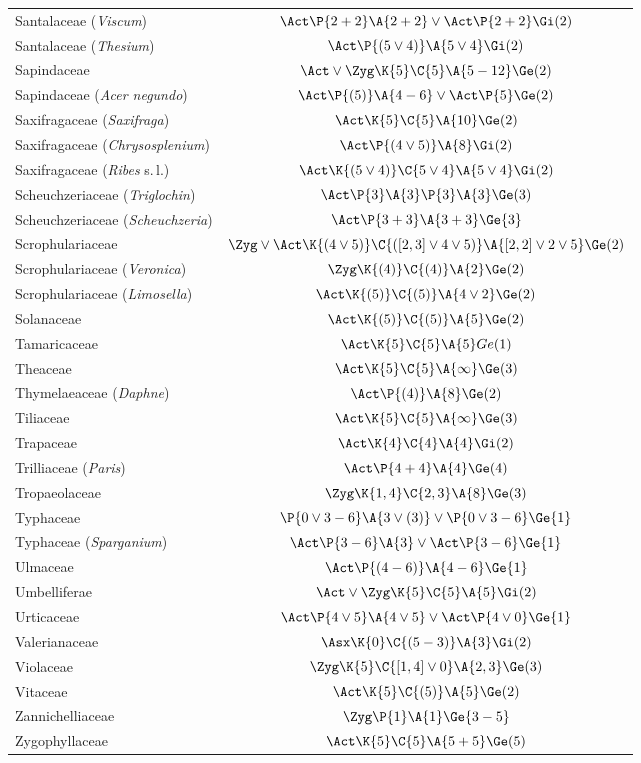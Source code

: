 ﻿\documentclass[12pt]{article}
\begin{document}
\begin{longtable}{lc}
Santalaceae (\textit{Viscum}) & $\Act\P{2+2}\A{2+2}\vee\Act\P{2+2}\Gi(2)$\\[2pt]
Santalaceae (\textit{Thesium}) & $\Act\P{(5\vee4)}\A{5\vee4}\Gi(2)$\\[2pt]
Sapindaceae & $\Act\vee\Zyg\K{5}\C{5}\A{5-12}\Ge(2)$\\[2pt]
Sapindaceae (\textit{Acer negundo}) & $\Act\P{(5)}\A{4-6}\vee\Act\P{5}\Ge(2)$\\[2pt]
Saxifragaceae (\textit{Saxifraga}) & $\Act\K{5}\C{5}\A{10}\Ge(2)$\\[2pt]
Saxifragaceae (\textit{Chrysosplenium}) & $\Act\P{(4\vee5)}\A{8}\Gi(2)$\\[2pt]
Saxifragaceae (\textit{Ribes} s.\,l.) & $\Act\K{(5\vee4)}\C{5\vee4}\A{5\vee4}\Gi(2)$\\[2pt]
Scheuchzeriaceae (\textit{Triglochin}) & $\Act\P{3}\A{3}\P{3}\A{3}\Ge(3)$\\[2pt]
Scheuchzeriaceae (\textit{Scheuchzeria}) & $\Act\P{3+3}\A{3+3}\Ge{3}$\\[2pt]
Scrophulariaceae & $\Zyg\vee\Act\K{(4\vee5)}\C{([2,3]\vee4\vee5)}\A{[2,2]\vee2\vee5}\Ge(2)$\\[2pt]
Scrophulariaceae (\textit{Veronica}) & $\Zyg\K{(4)}\C{(4)}\A{2}\Ge(2)$\\[2pt]
Scrophulariaceae (\textit{Limosella}) & $\Act\K{(5)}\C{(5)}\A{4\vee2}\Ge(2)$\\[2pt]
Solanaceae & $\Act\K{(5)}\C{(5)}\A{5}\Ge(2)$\\[2pt]
Tamaricaceae & $\Act\K{5}\C{5}\A{5}Ge(1)$\\[2pt]
Theaceae & $\Act\K{5}\C{5}\A{\infty}\Ge(3)$\\[2pt]
Thymelaeaceae (\textit{Daphne}) & $\Act\P{(4)}\A{8}\Ge(2)$\\[2pt]
Tiliaceae & $\Act\K{5}\C{5}\A{\infty}\Ge(3)$\\[2pt]
Trapaceae & $\Act\K{4}\C{4}\A{4}\Gi(2)$\\[2pt]
Trilliaceae (\textit{Paris}) & $\Act\P{4+4}\A{4}\Ge(4)$\\[2pt]
Tropaeolaceae & $\Zyg\K{1,4}\C{2,3}\A{8}\Ge(3)$\\[2pt]
Typhaceae & $\P{0\vee3-6}\A{3\vee(3)}\vee\P{0\vee3-6}\Ge{1}$\\[2pt]
Typhaceae (\textit{Sparganium}) & $\Act\P{3-6}\A{3}\vee\Act\P{3-6}\Ge{1}$\\[2pt]
Ulmaceae & $\Act\P{(4-6)}\A{4-6}\Ge{1}$\\[2pt]
Umbelliferae & $\Act\vee\Zyg\K{5}\C{5}\A{5}\Gi(2)$\\[2pt]
Urticaceae & $\Act\P{4\vee5}\A{4\vee5}\vee\Act\P{4\vee0}\Ge{1}$\\[2pt]
Valerianaceae & $\Asx\K{0}\C{(5-3)}\A{3}\Gi(2)$\\[2pt]
Violaceae & $\Zyg\K{5}\C{[1,4]\vee0}\A{2,3}\Ge(3)$\\[2pt]
Vitaceae & $\Act\K{5}\C{(5)}\A{5}\Ge(2)$\\[2pt]
Zannichelliaceae & $\Zyg\P{1}\A{1}\Ge{3-5}$\\[2pt]
Zygophyllaceae & $\Act\K{5}\C{5}\A{5+5}\Ge(5)$\\[2pt]\hline
\end{longtable}
\end{document}

